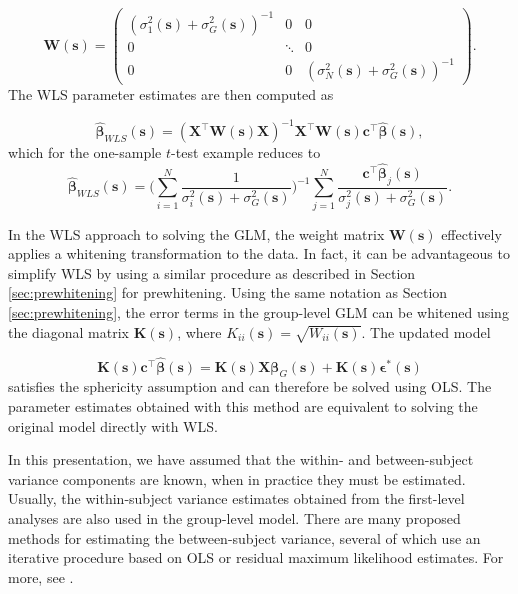 \begin{equation}
\bm{W}(\bm{s}) = 
\label{weight_matrix}
\begin{pmatrix}
(\sigma_{1}^{2}(\bm{s}) + \sigma_{G}^{2}(\bm{s}))^{-1} & 0 & 0 \\
0 & \ddots & 0 \\
0 & 0 & (\sigma_{N}^{2}(\bm{s}) + \sigma_{G}^{2}(\bm{s}))^{-1}
\end{pmatrix}.
\end{equation}
The WLS parameter estimates are then computed as

\begin{equation}
\label{eq:WLS_estimates}
\hat{\bm{\beta}}_{WLS}(\bm{s}) = (\bm{X}^{\intercal}\bm{W}(\bm{s})\bm{X})^{-1}\bm{X}^{\intercal}\bm{W}(\bm{s})\bm{c}^{\intercal}\hat{\bm{\beta}}(\bm{s}),
\end{equation}
which for the one-sample $t$-test example reduces to
\begin{equation}
\label{eq:WLS_t_test}
\hat{\bm{\beta}}_{WLS}(\bm{s}) = \Bigg(\sum_{i=1}^{N} \frac{1}{\sigma^{2}_{i}(\bm{s}) + \sigma^{2}_{G}(\bm{s})}\Bigg)^{-1}\sum_{j=1}^{N} \frac{\bm{c}^{\intercal}\hat{\bm{\beta}}_{j}(\bm{s})}{\sigma^{2}_{j}(\bm{s}) + \sigma^{2}_{G}(\bm{s})}.
\end{equation}

In the WLS approach to solving the GLM, the weight matrix $\bm{W}(\bm{s})$ effectively applies a whitening transformation to the data. In fact, it can be advantageous to simplify WLS by using a similar procedure as described in Section \ref{sec:prewhitening} for prewhitening. Using the same notation as Section \ref{sec:prewhitening}, the error terms in the group-level GLM can be whitened using the diagonal matrix $\bm{K}(\bm{s})$, where $K_{ii}(\bm{s}) = \sqrt{W_{ii}(\bm{s})}$.  The updated model

\begin{equation} 
\label{eq:whitened_group_model}
\bm{K}(\bm{s})\bm{c}^{\intercal}\hat{\bm{\beta}}(\bm{s}) = \bm{K}(\bm{s})\bm{X}\bm{\beta}_{G}(\bm{s}) + \bm{K}(\bm{s})\bm{\epsilon}^{*}(\bm{s})
\end{equation}
satisfies the sphericity assumption and can therefore be solved using OLS. The parameter estimates obtained with this method are equivalent to solving the original model directly with WLS. 

In this presentation, we have assumed that the within- and between-subject variance components are known, when in practice they must be estimated. Usually, the within-subject variance estimates obtained from the first-level analyses are also used in the group-level model. There are many proposed methods for estimating the between-subject variance, several of which use an iterative procedure based on OLS or residual maximum likelihood estimates. For more, see \citep{Searle2009-ku, Woolrich2004-ng, Worsley2000-rb}. 

